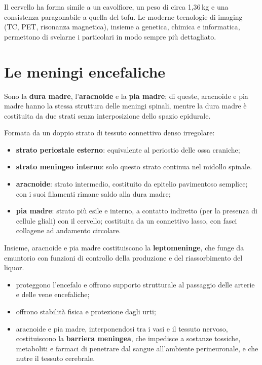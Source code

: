 Il cervello ha forma simile a un cavolfiore, un peso di circa 1,36\,kg e una
consistenza paragonabile a quella del tofu. Le moderne tecnologie di
imaging (TC, PET, risonanza magnetica), insieme a genetica, chimica e
informatica, permettono di svelarne i particolari in modo sempre più
dettagliato.

\section{Le meningi encefaliche}

Sono la \textbf{dura madre}, l'\textbf{aracnoide} e la \textbf{pia madre}; di
queste, aracnoide e pia madre hanno la stessa struttura delle meningi
spinali, mentre la dura madre è costituita da due strati senza
interposizione dello spazio epidurale.

Formata da un doppio strato di tessuto connettivo denso irregolare:
\begin{itemize}
  \item \textbf{strato periostale esterno}: equivalente al periostio delle
    ossa craniche;
  \item \textbf{strato meningeo interno}: solo questo strato continua nel
    midollo spinale.
\end{itemize}

\begin{itemize}
  \item \textbf{aracnoide}: strato intermedio, costituito da epitelio
    pavimentoso semplice; con i suoi filamenti rimane saldo alla dura madre;
  \item \textbf{pia madre}: strato più esile e interno, a contatto indiretto
    (per la presenza di cellule gliali) con il cervello; costituita da un
    connettivo lasso, con fasci collagene ad andamento circolare.
\end{itemize}
Insieme, aracnoide e pia madre costituiscono la \textbf{leptomeninge}, che
funge da emuntorio con funzioni di controllo della produzione e del
riassorbimento del liquor.

\begin{itemize}
  \item proteggono l'encefalo e offrono supporto strutturale al passaggio
    delle arterie e delle vene encefaliche;
  \item offrono stabilità fisica e protezione dagli urti;
  \item aracnoide e pia madre, interponendosi tra i vasi e il tessuto
    nervoso, costituiscono la \textbf{barriera meningea}, che impedisce a
    sostanze tossiche, metaboliti e farmaci di penetrare dal sangue
    all'ambiente perineuronale, e che nutre il tessuto cerebrale.
\end{itemize}

